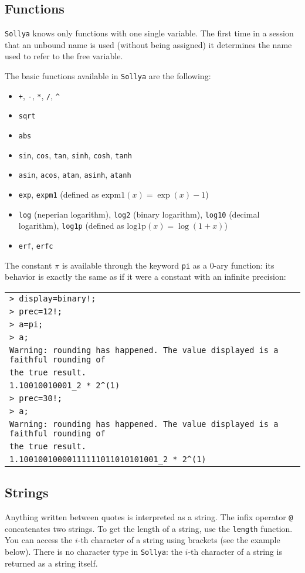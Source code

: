 \documentclass[a4paper]{article}
\newcommand{\com}[1]{\texttt{#1}}
\newcommand{\key}[1]{\texttt{#1}}
\newcommand{\sollya}{\texttt{Sollya}\xspace}
\newcommand{\code}[1]{
\begin{center}
\begin{tabular}{|p{14.8cm}|}
\hline
#1
\hline
\end{tabular}
\end{center}
}
\newcommand{\ligne}[1]{\texttt{#1}\\}
\begin{document}
\subsection{Functions}
\sollya knows only functions with one single variable. The first time in a session that an unbound name is used (without being assigned) it determines the name used to refer to the free variable.

The basic functions available in \sollya are the following:
\begin{itemize}
\item \com{+}, \com{-}, \com{*}, \com{/}, \com{\^{}}
\item \com{sqrt}
\item \com{abs}
\item \com{sin}, \com{cos}, \com{tan}, \com{sinh}, \com{cosh}, \com{tanh}
\item \com{asin}, \com{acos}, \com{atan}, \com{asinh}, \com{atanh}
\item \com{exp}, \com{expm1} (defined as $\mathrm{expm1}(x) = \exp(x)-1$)
\item \com{log} (neperian logarithm), \com{log2} (binary logarithm), \com{log10} (decimal logarithm), \com{log1p} (defined as $\mathrm{log1p}(x) = \log(1+x)$)
\item \com{erf}, \com{erfc}
\end{itemize}

The constant $\pi$ is available through the keyword \key{pi} as a $0$-ary function: its behavior is exactly the same as if it were a constant with an infinite precision:

\code{
\ligne{> display=binary!;}
\ligne{> prec=12!;}
\ligne{> a=pi;}
\ligne{> a;}
\ligne{Warning: rounding has happened. The value displayed is a faithful rounding of}
\ligne{the true result.}
\ligne{1.10010010001\_2 * 2\^{}(1)}
\ligne{> prec=30!;}
\ligne{> a;}
\ligne{Warning: rounding has happened. The value displayed is a faithful rounding of}
\ligne{the true result.}
\ligne{1.10010010000111111011010101001\_2 * 2\^{}(1)}
}


\subsection{Strings}
Anything written between quotes is interpreted as a string. The infix operator \com{@} concatenates two strings. To get the length of a string, use the \com{length} function. You can access the $i$-th character of a string using brackets (see the example below). There is no character type in \sollya: the $i$-th character of a string is returned as a string itself.
\end{document}
